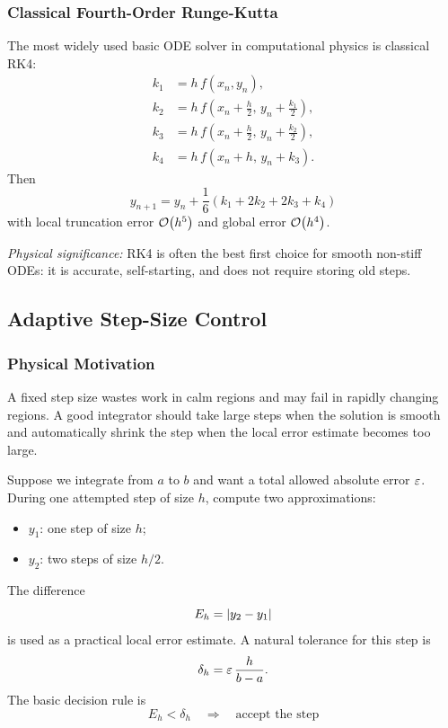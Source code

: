 \subsubsection{Classical Fourth-Order Runge-Kutta}
The most widely used basic ODE solver in computational physics is classical
RK4:
\begin{align}
    k_1 &= h\,f(x_n,y_n),
    \label{eq:lec06:rk4-k1}\\
    k_2 &= h\,f\left(x_n+\frac{h}{2},\,y_n+\frac{k_1}{2}\right),
    \label{eq:lec06:rk4-k2}\\
    k_3 &= h\,f\left(x_n+\frac{h}{2},\,y_n+\frac{k_2}{2}\right),
    \label{eq:lec06:rk4-k3}\\
    k_4 &= h\,f(x_n+h,\,y_n+k_3).
    \label{eq:lec06:rk4-k4}
\end{align}
Then
\begin{equation}
    \boxed{
    y_{n+1}
    =y_n+\frac{1}{6}\left(k_1+2k_2+2k_3+k_4\right)}
    \label{eq:lec06:rk4-update}
\end{equation}
with local truncation error $\mathcal{O}\!\left(h^5\right)$ and global error $\mathcal{O}\!\left(h^4\right)$.

\textit{Physical significance:} RK4 is often the best first choice for smooth
non-stiff ODEs: it is accurate, self-starting, and does not require storing
old steps.

\subsection{Adaptive Step-Size Control}\label{subsec:lec06:adaptive}

\subsubsection*{Physical Motivation}
A fixed step size wastes work in calm regions and may fail in rapidly
changing regions. A good integrator should take large steps when the solution
is smooth and automatically shrink the step when the local error estimate
becomes too large.

Suppose we integrate from $a$ to $b$ and want a total allowed absolute error
$\varepsilon$. During one attempted step of size $h$, compute two approximations:
\begin{itemize}
    \item $y_{1}$: one step of size $h$;
    \item $y_{2}$: two steps of size $h/2$.
\end{itemize}
The difference
\begin{equation}
    E_h=\left|y_2-y_1\right|
    \label{eq:lec06:adaptive-error-estimate}
\end{equation}
is used as a practical local error estimate. A natural tolerance for this
step is
\begin{equation}
    \delta_h=\varepsilon\,\frac{h}{b-a}.
    \label{eq:lec06:local-tolerance}
\end{equation}
The basic decision rule is
\begin{equation}
    \boxed{
    E_h<\delta_h
    \quad\Longrightarrow\quad
    \text{accept the step}}
    \label{eq:lec06:accept-rule}
\end{equation}

